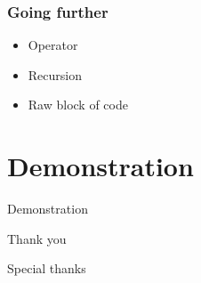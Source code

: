 \documentclass{beamer}
\begin{document}


\begin{frame}
\frametitle{Going further}

\begin{itemize}
\item Operator
\item Recursion
\item Raw block of code
\end{itemize}

\end{frame}

\section{Demonstration}
\begin{frame}
\Huge{\centerline{Demonstration}}
\end{frame}


\begin{frame}
\Huge{\centerline{Thank you}}
\end{frame}


\begin{frame}
\Huge{\centerline{Special thanks}}
\end{frame}


%


\end{document}
